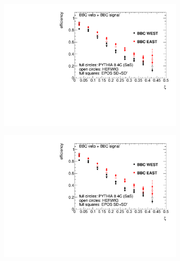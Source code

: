 \begin{figure}[H]
	
	\centering
	\begin{subfigure}{.49\textwidth}
		\includegraphics[width=\textwidth,page=2]{chapters/chrgSTAR/img/bbcCorrection/xiSD_bbc.pdf}
	\end{subfigure}
	\vspace{-0.1cm}
	\hfill
	\begin{subfigure}{.49\textwidth}
		\includegraphics[width=\textwidth,page=3]{chapters/chrgSTAR/img/bbcCorrection/xiSD_bbc.pdf}
	\end{subfigure}
	

\end{figure}
